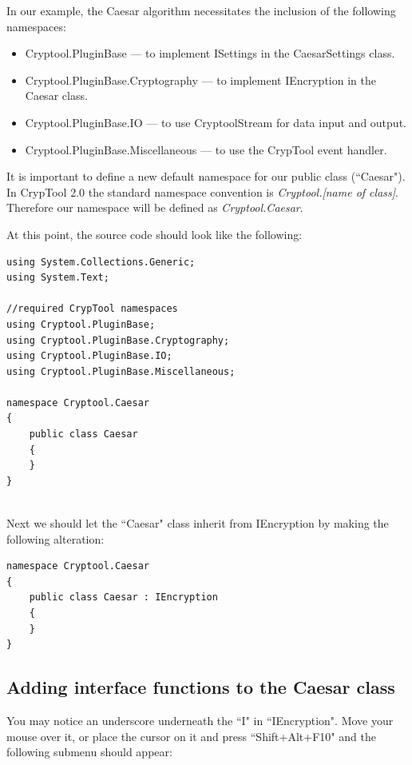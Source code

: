 \noindent In our example, the Caesar algorithm necessitates the inclusion of the following namespaces:

\begin{itemize}
	\item Cryptool.PluginBase --- to implement ISettings in the CaesarSettings class.
	\item Cryptool.PluginBase.Cryptography --- to implement IEncryption in the Caesar class.
	\item Cryptool.PluginBase.IO --- to use CryptoolStream for data input and output.
	\item Cryptool.PluginBase.Miscellaneous --- to use the CrypTool event handler.
\end{itemize}

\noindent It is important to define a new default namespace for our public class (``Caesar"). In CrypTool 2.0  the standard namespace convention is \textit{Cryptool.[name of class]}. Therefore our namespace will be defined as \textit{Cryptool.Caesar}.\clearpage

\noindent At this point, the source code should look like the following:

\begin{lstlisting}
using System.Collections.Generic;
using System.Text;

//required CrypTool namespaces
using Cryptool.PluginBase;
using Cryptool.PluginBase.Cryptography;
using Cryptool.PluginBase.IO;
using Cryptool.PluginBase.Miscellaneous;

namespace Cryptool.Caesar
{
	public class Caesar
	{
	}
}
\end{lstlisting}

\ \\ %
\noindent Next we should let the ``Caesar" class inherit from IEncryption by making the following alteration:

\begin{lstlisting}
namespace Cryptool.Caesar
{
	public class Caesar : IEncryption
	{
	}
}
\end{lstlisting}

\subsection{Adding interface functions to the Caesar class}
\label{sec:AddingInterfaceFunctionsToTheCaesarClass}

You may notice an underscore underneath the ``I" in ``IEncryption". Move your mouse over it, or place the cursor on it and press ``Shift+Alt+F10" and the following submenu should appear:

